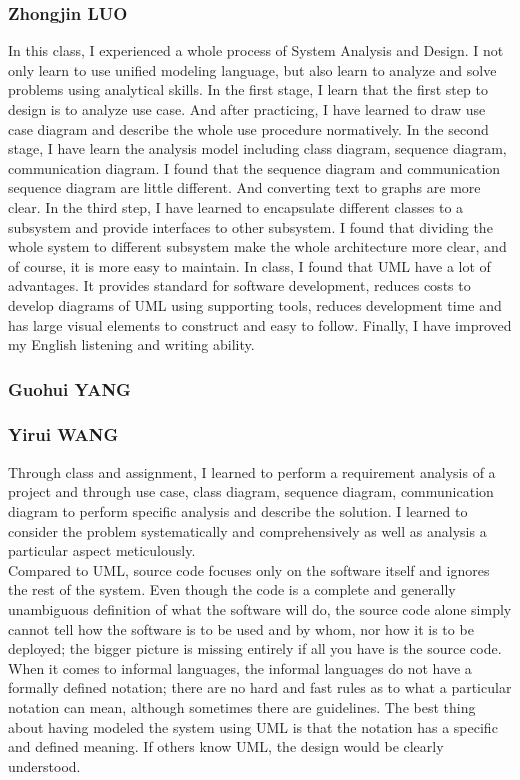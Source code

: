 \documentclass[12pt]{scrreprt}
\begin{document}
\subsubsection{Zhongjin LUO}
In this class, I experienced a whole process of System Analysis and Design. I not only learn to use unified modeling language, but also learn to analyze and solve problems using analytical skills. In the first stage, I learn that the first step to design is to analyze use case. And after practicing, I have learned to draw use case diagram and describe the whole use procedure normatively. In the second stage, I have learn the analysis model including class diagram, sequence diagram, communication diagram. I found that the sequence diagram and communication sequence diagram are little different. And converting text to graphs are more clear. In the third step, I have learned to encapsulate different classes to a subsystem and provide  interfaces to other subsystem. I found that dividing the whole system to different subsystem make the whole architecture more clear, and of course, it is more easy to maintain. In class, I found that UML have a lot of advantages. It provides standard for software development, reduces costs to develop diagrams of UML using supporting tools, reduces development time and has large visual elements to construct and easy to follow. Finally, I have improved my English listening and writing ability. 

\subsubsection{Guohui YANG}


\subsubsection{Yirui WANG}
Through class and assignment, I learned to perform a requirement analysis of a project and through use case, class diagram, sequence diagram, communication diagram to perform specific analysis and describe the solution. I learned to consider the problem systematically and comprehensively as well as analysis a particular aspect meticulously.\\
Compared to UML, source code focuses only on the software itself and ignores the rest of the system. Even though the code is a complete and generally unambiguous definition of what the software will do, the source code alone simply cannot tell how the software is to be used and by whom, nor how it is to be deployed; the bigger picture is missing entirely if all you have is the source code. When it comes to informal languages, the informal languages do not have a formally defined notation; there are no hard and fast rules as to what a particular notation can mean, although sometimes there are guidelines. The best thing about having modeled the system using UML is that the notation has a specific and defined meaning. If others know UML, the design would be clearly understood.
\end{document}
